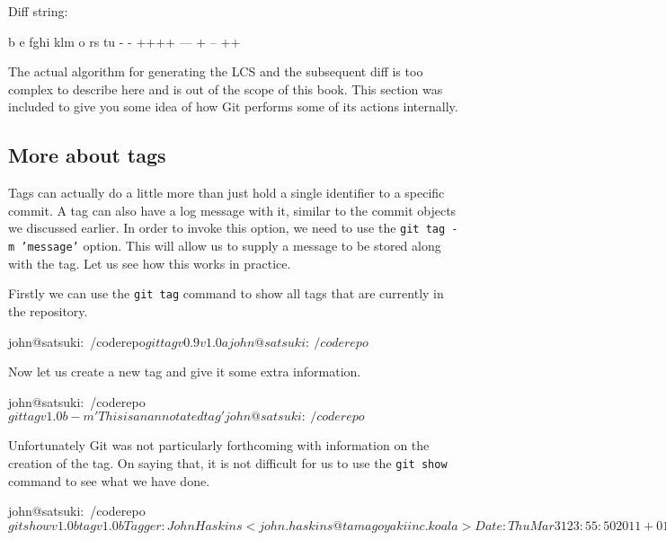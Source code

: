 Diff string:
\begin{code}
b e fghi klm o rs tu
- - ++++ --- + -- ++
\end{code}

The actual algorithm for generating the LCS and the subsequent diff is too complex to describe here and is out of the scope of this book.  This section was included to give you some idea of how Git performs some of its actions internally.

\subsection{More about tags}
Tags can actually do a little more than just hold a single identifier to a specific commit.  A tag can also have a log message with it, similar to the commit objects we discussed earlier.  In order to invoke this option, we need to use the \texttt{git tag -m 'message'} option.  This will allow us to supply a message to be stored along with the tag.  Let us see how this works in practice.

Firstly we can use the \texttt{git tag} command to show all tags that are currently in the repository.

\begin{code}
john@satsuki:~/coderepo$ git tag
v0.9
v1.0a
john@satsuki:~/coderepo$ 
\end{code}

Now let us create a new tag and give it some extra information.
\begin{code}
john@satsuki:~/coderepo$ git tag v1.0b -m 'This is an annotated tag'
john@satsuki:~/coderepo$ 
\end{code}

Unfortunately Git was not particularly forthcoming with information on the creation of the tag.  On saying that, it is not difficult for us to use the \texttt{git show} command to see what we have done.

\begin{code}
john@satsuki:~/coderepo$ git show v1.0b
tag v1.0b
Tagger: John Haskins <john.haskins@tamagoyakiinc.koala>
Date:   Thu Mar 31 23:55:50 2011 +0100

This is an annotated tag

commit a022d4d1edc69970b4e8b3fe1da3dccd943a55e4
Author: John Haskins <john.haskins@tamagoyakiinc.koala>
Date:   Thu Mar 31 22:05:55 2011 +0100

    Messed with a few files

diff --git a/my_second_committed_file b/my_second_committed_file
index 095b9cd..c9887f8 100644
--- a/my_second_committed_file
+++ b/my_second_committed_file
@@ -1,2 +1 @@
-Change1
-Change2
+Changed this file completely
diff --git a/my_third_committed_file b/my_third_committed_file
new file mode 100644
index 0000000..5d27866
--- /dev/null
+++ b/my_third_committed_file
@@ -0,0 +1 @@
+Addition to the line
john@satsuki:~/coderepo$ 
\end{code}

